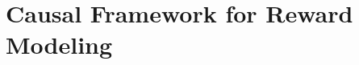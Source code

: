 
\vspace{-0.1in}
\section{Causal Framework for Reward Modeling}
\label{sec:preliminaries}

\vspace{-0.05in}



